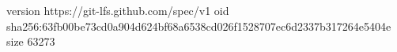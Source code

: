 version https://git-lfs.github.com/spec/v1
oid sha256:63fb00be73cd0a904d624bf68a6538cd026f1528707ec6d2337b317264e5404e
size 63273
